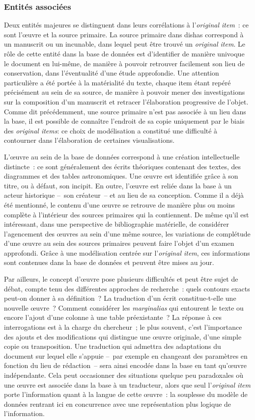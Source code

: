 \documentclass[a4paper,12pt,twoside]{book}
\newcommand{\eng}{\emph}
\newcommand{\oi}{\eng{original item}\xspace}
\newcommand{\ois}{\eng{original items}\xspace}
\newcommand{\dishas}{\gls{dishas}\xspace}
\begin{document}
			\subsubsection{Entités associées}
Deux entités majeures se distinguent dans leurs corrélations à l'\oi~: ce sont l'œuvre et la source primaire. La source primaire dans \dishas correspond à un manuscrit ou un incunable, dans lequel peut être trouvé un \oi. Le rôle de cette entité dans la base de données est d'identifier de manière univoque le document en lui-même, de manière à pouvoir retrouver facilement son lieu de conservation, dans l'éventualité d'une étude approfondie. Une attention particulière a été portée à la matérialité du texte, chaque item étant repéré précisément au sein de sa source, de manière à pouvoir mener des investigations sur la composition d'un manuscrit et retracer l'élaboration progressive de l'objet. Comme dit précédemment, une source primaire n'est pas associée à un lieu dans la base, il est possible de connaître l'endroit de sa copie uniquement par le biais des \ois: ce choix de modélisation a constitué une difficulté à contourner dans l'élaboration de certaines visualisations.

L'œuvre au sein de la base de données correspond à une création intellectuelle distincte~: ce sont généralement des écrits théoriques contenant des textes, des diagrammes et des tables astronomiques. Une œuvre est identifiée grâce à son titre, ou à défaut, son incipit. En outre, l'œuvre est reliée dans la base à un acteur historique –~son créateur~– et au lieu de sa conception. Comme il a déjà été mentionné, le contenu d'une œuvre se retrouve de manière plus ou moins complète à l'intérieur des sources primaires qui la contiennent. De même qu'il est intéressant, dans une perspective de bibliographie matérielle, de considérer l'agencement des œuvres au sein d'une même source, les variations de complétude d'une œuvre au sein des sources primaires peuvent faire l'objet d'un examen approfondi. Grâce à une modélisation centrée sur l'\oi, ces informations sont contenues dans la base de données et peuvent être mises au jour.

Par ailleurs, le concept d'œuvre pose plusieurs difficultés et peut être sujet de débat, compte tenu des différentes approches de recherche~: quels contours exacts peut-on donner à sa définition~? La traduction d'un écrit constitue-t-elle une nouvelle œuvre~? Comment considérer les \eng{marginalias} qui entourent le texte ou encore l'ajout d'une colonne à une table préexistante~? La réponse à ces interrogations est à la charge du chercheur~; le plus souvent, c'est l'importance des ajouts et des modifications qui distingue une œuvre originale, d'une simple copie ou transposition. Une traduction qui admettra des adaptations du document sur lequel elle s'appuie –~par exemple en changeant des paramètres en fonction du lieu de rédaction~– sera ainsi encodée dans la base en tant qu'œuvre indépendante. Cela peut occasionner des situations quelque peu paradoxales où une œuvre est associée dans la base à un traducteur, alors que seul l'\oi porte l'information quant à la langue de cette œuvre~: la souplesse du modèle de données rentrant ici en concurrence avec une représentation plus logique de l'information.
\end{document}
